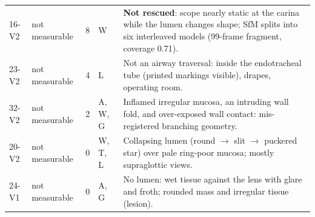 \begin{tabular}{llrlp{8.6cm}}
16-V2 & not measurable & 8 & W & \textbf{Not rescued}: scope nearly static at the carina while the lumen changes shape; SfM splits into six interleaved models (99-frame fragment, coverage 0.71). \\
23-V2 & not measurable & 4 & L & Not an airway traversal: inside the endotracheal tube (printed markings visible), drapes, operating room. \\
32-V2 & not measurable & 2 & A, W, G & Inflamed irregular mucosa, an intruding wall fold, and over-exposed wall contact: mis-registered branching geometry. \\
20-V2 & not measurable & 0 & W, T, L & Collapsing lumen (round $\to$ slit $\to$ puckered star) over pale ring-poor mucosa; mostly supraglottic views. \\
24-V1 & not measurable & 0 & A, G & No lumen: wet tissue against the lens with glare and froth; rounded mass and irregular tissue (lesion). \\
\bottomrule
\end{tabular}
